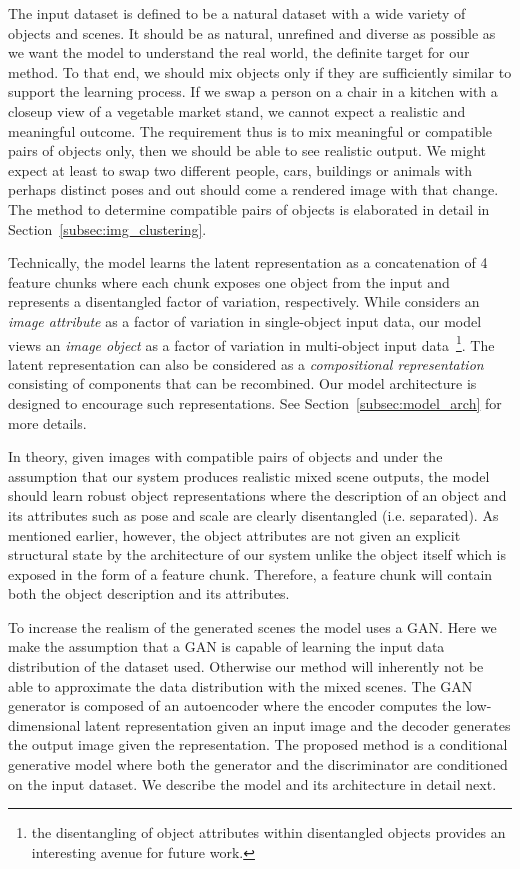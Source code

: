 \documentclass[12pt,a4paper]{article}
\begin{document}
The input dataset is defined to be a natural dataset with a wide variety of objects and scenes. It should be as natural, unrefined and diverse as possible as we want the model to understand the real world, the definite target for our method. To that end, we should mix objects only if they are sufficiently similar to support the learning process. If we swap a person on a chair in a kitchen with a closeup view of a vegetable market stand, we cannot expect a realistic and meaningful outcome. The requirement thus is to mix meaningful or compatible pairs of objects only, then we should be able to see realistic output. We might expect at least to swap two different people, cars, buildings or animals with perhaps distinct poses and out should come a rendered image with that change. The method to determine compatible pairs of objects is elaborated in detail in Section~\ref{subsec:img_clustering}. 

Technically, the model learns the latent representation as a concatenation of 4 feature chunks where each chunk exposes one object from the input and represents a disentangled factor of variation, respectively. While \cite{DisentFacOfVarByMixTh} considers an \textit{image attribute} as a factor of variation in single-object input data, our model views an \textit{image object} as a factor of variation in multi-object input data~\footnote{the disentangling of object attributes within disentangled objects provides an interesting avenue for future work.}. The latent representation can also be considered as a \textit{compositional representation}~\cite{SpatialBDecoder} consisting of components that can be recombined. %
Our model architecture is designed to encourage such representations. See Section~\ref{subsec:model_arch} for more details. 

In theory, given images with compatible pairs of objects and under the assumption that our system produces realistic mixed scene outputs, the model should learn robust object representations where the description of an object and its attributes such as pose and scale are clearly disentangled (i.e. separated). As mentioned earlier, however, the object attributes are not given an explicit structural state by the architecture of our system unlike the object itself which is exposed in the form of a feature chunk. Therefore, a feature chunk will contain both the object description and its attributes.

To increase the realism of the generated scenes the model uses a GAN. Here we make the assumption that a GAN is capable of learning the input data distribution of the dataset used. Otherwise our method will inherently not be able to approximate the data distribution with the mixed scenes. The GAN generator is composed of an autoencoder where the encoder computes the low-dimensional latent representation given an input image and the decoder generates the output image given the representation. The proposed method is a conditional generative model where both the generator and the discriminator are conditioned on the input dataset. We describe the model and its architecture in detail next.
\end{document}

